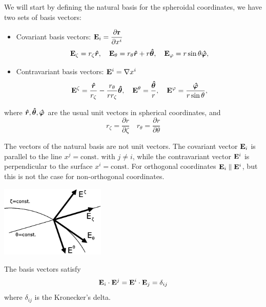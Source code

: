 We will start by defining the natural basis for the spheroidal coordinates, we have two sets of basis vectors:
\begin{itemize}
\item Covariant basis vectors: $\displaystyle\mathbf{E}_i=\frac{\partial\mathbf{r}}
{\partial x^i}$
\begin{equation}
\mathbf{E}_\zeta=r_\zeta\boldsymbol{\hat r}, \quad
\mathbf{E}_\theta=r_\theta\boldsymbol{\hat r}+r\boldsymbol{\hat \theta}, \quad
\mathbf{E}_\varphi=r\sin\theta\boldsymbol{\hat \varphi},
\end{equation}
\item Contravariant basis vectors: $\mathbf{E}^i=\nabla x^i$
\begin{equation}
\mathbf{E}^\zeta=\frac{\boldsymbol{\hat r}}{r_\zeta}-\frac{r_\theta}{rr_\zeta}\boldsymbol{\hat \theta}, \quad
\mathbf{E}^\theta=\frac{\boldsymbol{\hat \theta}}{r},\quad
\mathbf{E}^{\varphi}=\frac{\boldsymbol{\hat \varphi}}{r\sin\theta},
\end{equation}
\end{itemize}
\noindent where $\boldsymbol{\hat r},\boldsymbol{\hat \theta},\boldsymbol{\hat \varphi}$ are the usual unit vectors in spherical coordinates, and
$$r_\zeta=\frac{\partial r}{\partial\zeta}\quad r_\theta=\frac{\partial r}{\partial\theta}$$

The vectors of the natural basis are not unit vectors. The covariant vector $\mathbf{E}_i$ is parallel to 
the line $x^j=\mathrm{const.}$ with $j\ne i$, while the contravariant vector $\mathbf{E}^i$ is 
perpendicular to the surface $x^i=\mathrm{const.}$ For orthogonal coordinates $\mathbf{E}_i\parallel\mathbf{E}^i$, but
this is not the case for non-orthogonal coordinates.

\begin{center}
\includegraphics[width=5cm]{fig/vectors.eps}
\end{center}

The basis vectors satisfy
\begin{equation}
\mathbf{E}_i\cdot\mathbf{E}^j=\mathbf{E}^i\cdot\mathbf{E}_j=\delta_{ij}
\end{equation}
where $\delta_{ij}$ is the Kronecker's delta.

